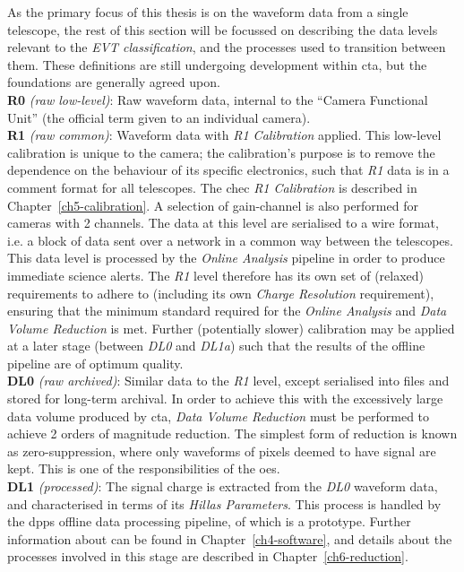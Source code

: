 As the primary focus of this thesis is on the waveform data from a single telescope, the rest of this section will be focussed on describing the data levels relevant to the \textit{EVT classification}, and the processes used to transition between them. These definitions are still undergoing development within \gls{cta}, but the foundations are generally agreed upon.
\\[4pt]
\indent\textbf{R0} \textit{(raw low-level)}:
Raw waveform data, internal to the ``Camera Functional Unit'' (the official term given to an individual camera).
\\[4pt]
\indent\textbf{R1} \textit{(raw common)}:
Waveform data with \textit{R1 Calibration} applied. This low-level calibration is unique to the camera; the calibration's purpose is to remove the dependence on the behaviour of its specific electronics, such that \textit{R1} data is in a comment format for all telescopes. The \gls{chec} \textit{R1 Calibration} is described in Chapter~\ref{ch5-calibration}. A selection of gain-channel is also performed for cameras with 2 channels. The data at this level are serialised to a wire format, i.e. a block of data sent over a network in a common way between the telescopes. This data level is processed by the \textit{Online Analysis} pipeline in order to produce immediate science alerts. The \textit{R1} level therefore has its own set of (relaxed) requirements to adhere to (including its own \textit{Charge Resolution} requirement), ensuring that the minimum standard required for the \textit{Online Analysis} and \textit{Data Volume Reduction} is met. Further (potentially slower) calibration may be applied at a later stage (between \textit{DL0} and \textit{DL1a}) such that the results of the offline pipeline are of optimum quality.
\\[4pt]
\indent\textbf{DL0} \textit{(raw archived)}: Similar data to the \textit{R1} level, except serialised into files and stored for long-term archival. In order to achieve this with the excessively large data volume produced by \gls{cta}, \textit{Data Volume Reduction} must be performed to achieve 2 orders of magnitude reduction. The simplest form of reduction is known as zero-suppression, where only waveforms of pixels deemed to have signal are kept. This is one of the responsibilities of the \gls{oes}.
\\[4pt]
\indent\textbf{DL1} \textit{(processed)}: The signal charge is extracted from the \textit{DL0} waveform data, and characterised in terms of its \textit{Hillas Parameters}. This process is handled by the \gls{dpps} offline data processing pipeline, of which  is a prototype. Further information about  can be found in Chapter~\ref{ch4-software}, and details about the processes involved in this stage are described in Chapter~\ref{ch6-reduction}.

